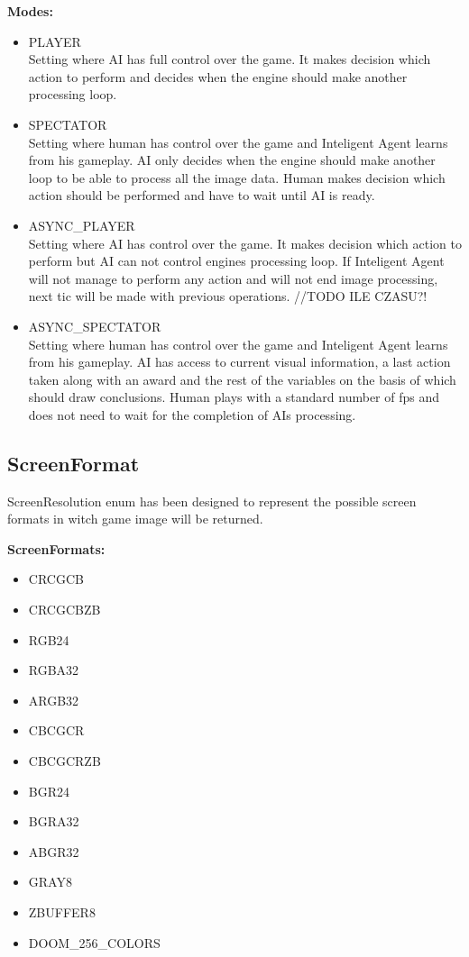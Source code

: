 \vspace{20pt}
\textbf{Modes:}
\begin{itemize}
\item PLAYER \\
Setting where AI has full control over the game. It makes decision which action to perform and decides when the engine should make another processing loop.
\item SPECTATOR \\
Setting where human has control over the game and Inteligent Agent learns from his gameplay. AI only decides when the engine should make another loop to be able to process all the image data. Human makes decision which action should be performed and have to wait until AI is ready. 
\item ASYNC\_PLAYER \\ 
Setting where AI has control over the game. It makes decision which action to perform but AI can not control engines processing loop. If Inteligent Agent will not manage to perform any action and will not end image processing, next tic will be made with previous operations.
//TODO ILE CZASU?!
\item ASYNC\_SPECTATOR \\
Setting where human has control over the game and Inteligent Agent learns from his gameplay. AI has access to current visual information, a last action taken along with an award and the rest of the variables on the basis of which should draw conclusions. Human plays with a standard number of fps and does not need to wait for the completion of AIs processing.
\end{itemize}

\subsection{ScreenFormat}\label{subsec:screenformat}
ScreenResolution enum has been designed to represent the possible screen formats in witch game image will be returned. 


\vspace{20pt}
\textbf{ScreenFormats:}
\begin{itemize}
 \item CRCGCB 
 \item CRCGCBZB
 \item RGB24
 \item RGBA32
 \item ARGB32
 \item CBCGCR
 \item CBCGCRZB
 \item BGR24
 \item BGRA32
 \item ABGR32
 \item GRAY8
 \item ZBUFFER8
 \item DOOM\_256\_COLORS
\end{itemize}
